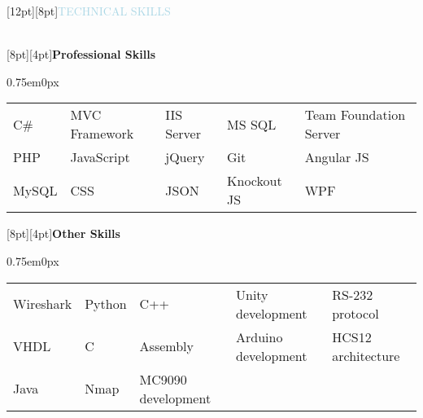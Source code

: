 \documentclass{res}
\newenvironment{ResumeBlock}[1]
{
	\begin{normalsize}
		\raisebox{0pt}[12pt][8pt]{\textcolor{lightblue}{#1}}
	\end{normalsize}
	\\
}
{	
}
\newenvironment{DetailsBlockNoSubheader}[1]
{
	\raisebox{0pt}[8pt][4pt]{\textbf{\color{darkfont}#1}}
	\begin{adjustwidth}{0.75em}{0px}
	}
	{	
	\end{adjustwidth}
}
\begin{document}
	\begin{ResumeBlock}{TECHNICAL SKILLS}		
		\begin{DetailsBlockNoSubheader}{Professional Skills}
			\begin{tabular}{ l l l l l }
				C\# & MVC Framework & IIS Server & MS SQL & Team Foundation Server \\ 
				PHP & JavaScript & jQuery & Git & Angular JS \\
				MySQL & CSS & JSON & Knockout JS & WPF \\
			\end{tabular}
		\end{DetailsBlockNoSubheader}
		\begin{DetailsBlockNoSubheader}{Other Skills}	
			\begin{tabular}{ l l l l l }
				Wireshark & Python & C++ & Unity development & RS-232 protocol \\ 
				VHDL & C & Assembly & Arduino development & HCS12 architecture \\ 
				Java & Nmap & MC9090 development \\
			\end{tabular}
		\end{DetailsBlockNoSubheader}
	\end{ResumeBlock}
\end{document}
